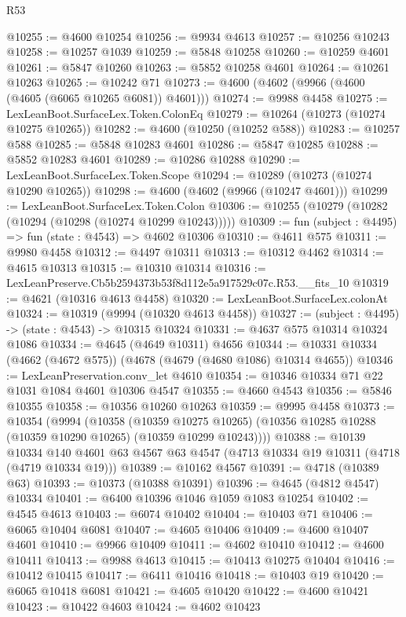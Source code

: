 \begin{lexlean}{R53}
\begin{coremodule}
@10255 := @4600 @10254
@10256 := @9934 @4613
@10257 := @10256 @10243
@10258 := @10257 @1039
@10259 := @5848 @10258
@10260 := @10259 @4601
@10261 := @5847 @10260
@10263 := @5852 @10258 @4601
@10264 := @10261 @10263
@10265 := @10242 @71
@10273 := @4600 (@4602 (@9966 (@4600 (@4605 (@6065 @10265 @6081)) @4601)))
@10274 := @9988 @4458
@10275 := LexLeanBoot.SurfaceLex.Token.ColonEq
@10279 := @10264 (@10273 (@10274 @10275 @10265))
@10282 := @4600 (@10250 (@10252 @588))
@10283 := @10257 @588
@10285 := @5848 @10283 @4601
@10286 := @5847 @10285
@10288 := @5852 @10283 @4601
@10289 := @10286 @10288
@10290 := LexLeanBoot.SurfaceLex.Token.Scope
@10294 := @10289 (@10273 (@10274 @10290 @10265))
@10298 := @4600 (@4602 (@9966 (@10247 @4601)))
@10299 := LexLeanBoot.SurfaceLex.Token.Colon
@10306 := @10255 (@10279 (@10282 (@10294 (@10298 (@10274 @10299 @10243)))))
@10309 := fun (subject : @4495) => fun (state : @4543) => @4602 @10306
@10310 := @4611 @575
@10311 := @9980 @4458
@10312 := @4497 @10311
@10313 := @10312 @4462
@10314 := @4615 @10313
@10315 := @10310 @10314
@10316 := LexLeanPreserve.Cb5b2594373b53f8d112e5a917529c07c.R53.__fits_10
@10319 := @4621 (@10316 @4613 @4458)
@10320 := LexLeanBoot.SurfaceLex.colonAt
@10324 := @10319 (@9994 (@10320 @4613 @4458))
@10327 := (subject : @4495) -> (state : @4543) -> @10315 @10324
@10331 := @4637 @575 @10314 @10324 @1086
@10334 := @4645 (@4649 @10311) @4656
@10344 := @10331 @10334 (@4662 (@4672 @575)) (@4678 (@4679 (@4680 @1086) @10314 @4655))
@10346 := LexLeanPreservation.conv_let @4610
@10354 := @10346 @10334 @71 @22 @1031 @1084 @4601 @10306 @4547
@10355 := @4660 @4543
@10356 := @5846 @10355
@10358 := @10356 @10260 @10263
@10359 := @9995 @4458
@10373 := @10354
    (@9994
      (@10358
        (@10359 @10275 @10265)
        (@10356 @10285 @10288 (@10359 @10290 @10265) (@10359 @10299 @10243))))
@10388 := @10139
    @10334
    @140
    @4601
    @63
    @4567
    @63
    @4547
    (@4713 @10334 @19 @10311 (@4718 (@4719 @10334 @19)))
@10389 := @10162 @4567
@10391 := @4718 (@10389 @63)
@10393 := @10373 (@10388 @10391)
@10396 := @4645 (@4812 @4547) @10334
@10401 := @6400 @10396 @1046 @1059 @1083 @10254
@10402 := @4545 @4613
@10403 := @6074 @10402
@10404 := @10403 @71
@10406 := @6065 @10404 @6081
@10407 := @4605 @10406
@10409 := @4600 @10407 @4601
@10410 := @9966 @10409
@10411 := @4602 @10410
@10412 := @4600 @10411
@10413 := @9988 @4613
@10415 := @10413 @10275 @10404
@10416 := @10412 @10415
@10417 := @6411 @10416
@10418 := @10403 @19
@10420 := @6065 @10418 @6081
@10421 := @4605 @10420
@10422 := @4600 @10421
@10423 := @10422 @4603
@10424 := @4602 @10423

\end{coremodule}
\end{lexlean}
